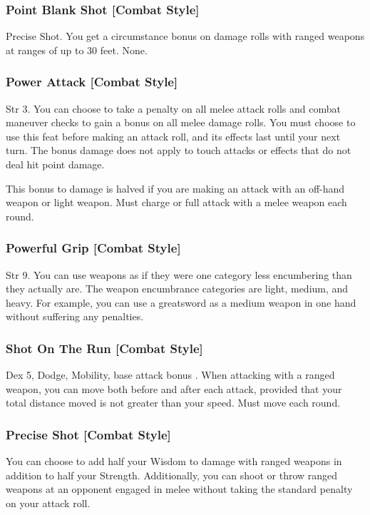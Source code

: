 \subsubsection{Point Blank Shot [Combat Style]}
 Precise Shot.
 You get a  circumstance bonus on damage rolls with ranged weapons at ranges of up to 30 feet. \bonusscalingdescription
{} None.

\subsubsection{Power Attack [Combat Style]}
 Str 3.
 You can choose to take a  penalty on all melee attack rolls and combat maneuver checks to gain a  bonus on all melee damage rolls. \bonusscalingdescription You must choose to use this feat before making an attack roll, and its effects last until your next turn. The bonus damage does not apply to touch attacks or effects that do not deal hit point damage.
\par This bonus to damage is halved if you are making an attack with an off-hand weapon or light weapon.
 Must charge or full attack with a melee weapon each round.

\subsubsection{Powerful Grip [Combat Style]}
 Str 9.
 You can use weapons as if they were one category less encumbering than they actually are. The weapon encumbrance categories are light, medium, and heavy. For example, you can use a greatsword as a medium weapon in one hand without suffering any penalties.

\subsubsection{Shot On The Run [Combat Style]}
 Dex 5, Dodge, Mobility, base attack bonus .
 When attacking with a ranged weapon, you can move both before and after each attack, provided that your total distance moved is not greater than your speed.
 Must move each round.

\subsubsection{Precise Shot [Combat Style]}
 You can choose to add half your Wisdom to damage with ranged weapons in addition to half your Strength. Additionally, you can shoot or throw ranged weapons at an opponent engaged in melee without taking the standard  penalty on your attack roll.

